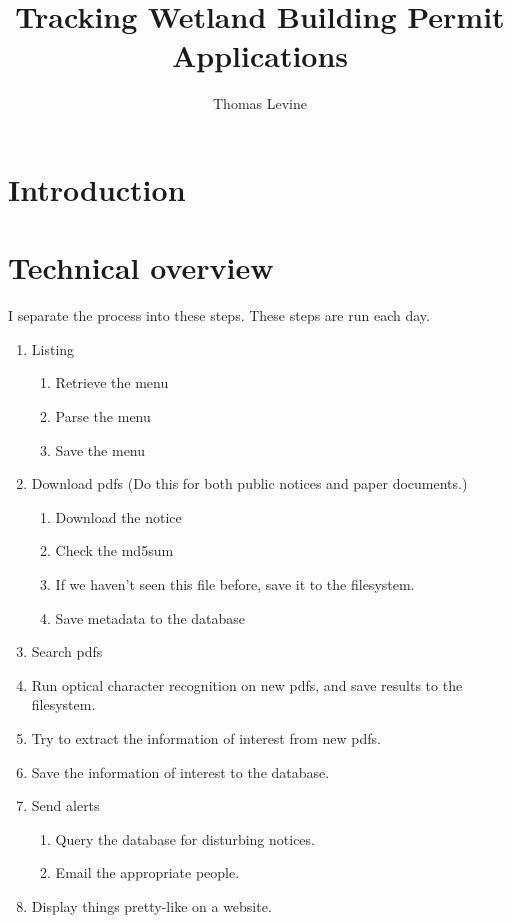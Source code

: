 \documentclass{article}
\title{Tracking Wetland Building Permit Applications}
\author{Thomas Levine}
\begin{document}
\maketitle

\section{Introduction}

\section{Technical overview}
I separate the process into these steps. These steps are run each day.

\begin{enumerate}
\item Listing
  \begin{enumerate}
  \item Retrieve the menu
  \item Parse the menu
  \item Save the menu
  \end{enumerate}
\item Download pdfs (Do this for both public notices and paper documents.)
  \begin{enumerate}
  \item Download the notice
  \item Check the md5sum
  \item If we haven't seen this file before, save it to the filesystem.
  \item Save metadata to the database
  \end{enumerate}
\item Search pdfs
  \item Run optical character recognition on new pdfs, and save results to the filesystem.
  \item Try to extract the information of interest from new pdfs.
  \item Save the information of interest to the database.
\item Send alerts
  \begin{enumerate}
  \item Query the database for disturbing notices.
  \item Email the appropriate people.
  \end{enumerate}
\item Display things pretty-like on a website.
\end{enumerate}
\end{document}
